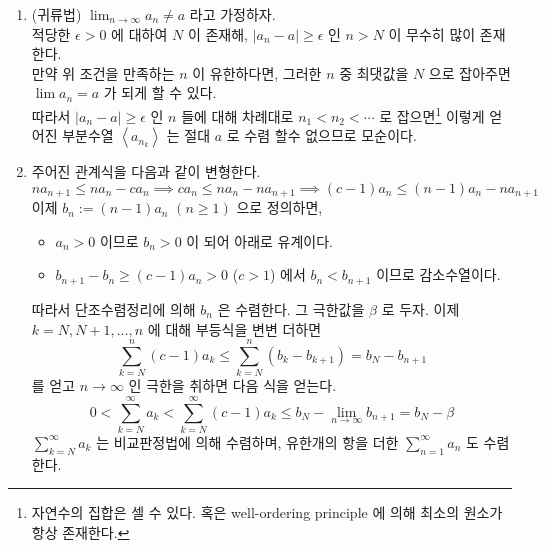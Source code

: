 \documentclass[12pt]{report}
\newcommand{\numl}[1]{\item[\large\textbf{\sffamily #1.}]}
\renewcommand{\span}[1]{\left\langle #1 \right\rangle}
\newcommand{\ra}{\rightarrow}
\newcommand{\abs}[1]{\left|#1\right|}
\newcommand{\ds}{\displaystyle}
\newcommand{\imp}{\implies}
\begin{document}
\begin{enumerate}
\numl{6} (귀류법) $\ds \lim_{n\ra\infty} a_n \neq a$ 라고 가정하자.\\
적당한 $\epsilon > 0$ 에 대하여 $N$ 이 존재해, $\abs{a_n - a} \geq \epsilon$ 인 $n>N$ 이 무수히 많이 존재한다.\\
만약 위 조건을 만족하는 $n$ 이 유한하다면, 그러한 $n$ 중 최댓값을 $N$ 으로 잡아주면 $\lim a_n = a$ 가 되게 할 수 있다.\\
따라서 $\abs{a_n-a} \geq \epsilon$ 인 $n$ 들에 대해 차례대로 $n_1 < n_2 < \cdots$ 로 잡으면\footnote{자연수의 집합은 셀 수 있다. 혹은 well-ordering principle 에 의해 최소의 원소가 항상 존재한다.} 이렇게 얻어진 부분수열 $\span{a_{n_k}}$ 는 절대 $a$ 로 수렴 할수 없으므로 모순이다. 

\numl{8} 주어진 관계식을 다음과 같이 변형한다. $$na_{n+1} \leq na_n-ca_n \imp ca_n \leq na_n - na_{n+1} \imp (c-1)a_n\leq (n-1)a_n-na_{n+1}$$
이제 $b_n := (n-1)a_n$ $(n\geq 1)$ 으로 정의하면,
\begin{itemize}
	\item $a_n>0$ 이므로 $b_n >0$ 이 되어 아래로 유계이다.
	\item $b_{n+1} - b_n \geq (c-1)a_n > 0$ ($c>1$) 에서 $b_n < b_{n+1}$ 이므로 감소수열이다.
\end{itemize}
따라서 단조수렴정리에 의해 $b_n$ 은 수렴한다. 그 극한값을 $\beta$ 로 두자. 이제 $k = N, N+1, \dots, n$ 에 대해 부등식을 변변 더하면
$$\sum_{k=N}^n (c-1)a_k \leq \sum_{k=N}^n(b_k - b_{k+1}) = b_N-b_{n+1}$$ 를 얻고 $n\ra \infty$ 인 극한을 취하면 다음 식을 얻는다.
$$0 < \sum_{k=N}^\infty a_k < \sum_{k=N}^\infty (c-1)a_k \leq b_N-\lim_{n\ra \infty} b_{n+1} = b_N-\beta $$
$\sum_{k=N}^\infty a_k$ 는 비교판정법에 의해 수렴하며, 유한개의 항을 더한 $\sum_{n=1}^\infty a_n$ 도 수렴한다.

\end{enumerate}
\end{document}
